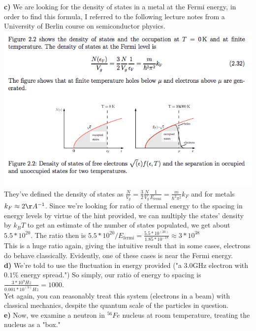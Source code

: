 \documentclass{journal}
\begin{document}
\textbf{c) } We are looking for the density of states in a metal at the Fermi energy, in order to find this formula, I referred to the following lecture notes from a University of Berlin course on semiconductor physics.\\
\includegraphics[width=\linewidth]{dos.png}\\

They've defined the density of states as $\frac{N}{V_g}=\frac32\frac{N}{V_g}\frac{1}{E_{\text{fermi}}}=\frac{m}{\hbar^2\pi^2}k_F$ and for metals  $k_F\approx2\AA^{-1}$. Since we're looking for ratio of thermal energy to the spacing in energy levels by virtue of the hint provided, we can multiply the states' density by $k_BT$ to get an estimate of the number of states populated, we get about $5.5*10^{20}$. The ratio then is $5.5*10^{20}/E_\text{fermi}=\frac{5.5*10^(20)}{1.85*10^{-18}}\approx3*10^{38}$\\

This is a huge ratio again, giving the intuitive result that in some cases, electrons do behave classically. Evidently, one of these cases is near the Fermi energy.\\

\textbf{d) } We're told to use the fluctuation in energy provided ("a 3.0GHz electron with $0.1\%$ energy spread.") So simply, our ratio of energy to spacing is $\frac{3*10^{9}Hz}{0.001*10^(9)Hz}=1000$.\\

Yet again, you can reasonably treat this system (electrons in a beam) with classical mechanics, despite the quantum scale of the particles in question.\\

\textbf{e) } Now, we examine a neutron in $^{56}{Fe}$ nucleus at room temperature, treating the nucleus as a "box."\\
\end{document}
